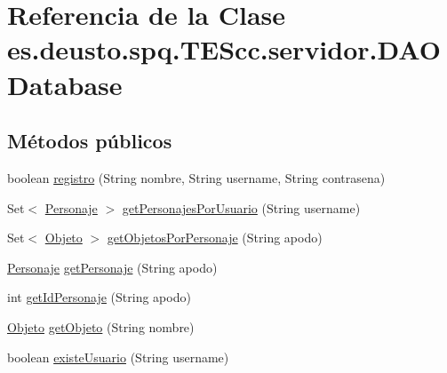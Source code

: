 \hypertarget{classes_1_1deusto_1_1spq_1_1_t_e_scc_1_1servidor_1_1_d_a_o_database}{\section{Referencia de la Clase es.\+deusto.\+spq.\+T\+E\+Scc.\+servidor.\+D\+A\+O\+Database}
\label{classes_1_1deusto_1_1spq_1_1_t_e_scc_1_1servidor_1_1_d_a_o_database}
}
\subsection*{Métodos públicos}
\begin{DoxyCompactItemize}
\item 
boolean \hyperlink{classes_1_1deusto_1_1spq_1_1_t_e_scc_1_1servidor_1_1_d_a_o_database_a318c4412b64dff4e2fbbc4c4f94b6d8f}{registro} (String nombre, String username, String contrasena)
\item 
Set$<$ \hyperlink{classes_1_1deusto_1_1spq_1_1_t_e_scc_1_1servidor_1_1jdo_1_1_personaje}{Personaje} $>$ \hyperlink{classes_1_1deusto_1_1spq_1_1_t_e_scc_1_1servidor_1_1_d_a_o_database_aa75bba45b6168c1802301e76ec04b754}{get\+Personajes\+Por\+Usuario} (String username)
\item 
Set$<$ \hyperlink{classes_1_1deusto_1_1spq_1_1_t_e_scc_1_1servidor_1_1jdo_1_1_objeto}{Objeto} $>$ \hyperlink{classes_1_1deusto_1_1spq_1_1_t_e_scc_1_1servidor_1_1_d_a_o_database_a77812bd213cb834b734b72df41373c30}{get\+Objetos\+Por\+Personaje} (String apodo)
\item 
\hyperlink{classes_1_1deusto_1_1spq_1_1_t_e_scc_1_1servidor_1_1jdo_1_1_personaje}{Personaje} \hyperlink{classes_1_1deusto_1_1spq_1_1_t_e_scc_1_1servidor_1_1_d_a_o_database_a528cc15eaa989459dd7e0fe9fab96871}{get\+Personaje} (String apodo)
\item 
int \hyperlink{classes_1_1deusto_1_1spq_1_1_t_e_scc_1_1servidor_1_1_d_a_o_database_a1b847c310ac4d49c5f13b42b747b0745}{get\+Id\+Personaje} (String apodo)
\item 
\hyperlink{classes_1_1deusto_1_1spq_1_1_t_e_scc_1_1servidor_1_1jdo_1_1_objeto}{Objeto} \hyperlink{classes_1_1deusto_1_1spq_1_1_t_e_scc_1_1servidor_1_1_d_a_o_database_a8fa5ac5864d13b02cad747bc898d436a}{get\+Objeto} (String nombre)
\item 
boolean \hyperlink{classes_1_1deusto_1_1spq_1_1_t_e_scc_1_1servidor_1_1_d_a_o_database_af6a12f17f5e2acd3ed677327c5efd333}{existe\+Usuario} (String username)

\end{DoxyCompactItemize}
